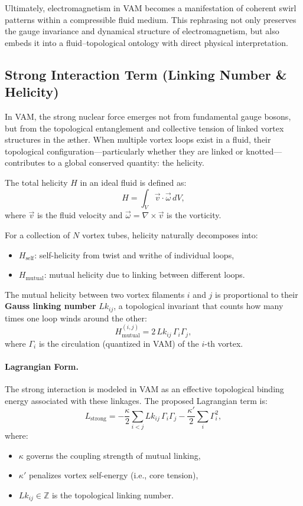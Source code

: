\documentclass[a4paper,12pt]{article}
\begin{document}
\vspace{1em}
Ultimately, electromagnetism in VAM becomes a manifestation of coherent swirl patterns within a compressible fluid medium. This rephrasing not only preserves the gauge invariance and dynamical structure of electromagnetism, but also embeds it into a fluid–topological ontology with direct physical interpretation.
\subsection{Strong Interaction Term (Linking Number \& Helicity)}

In VAM, the strong nuclear force emerges not from fundamental gauge bosons, but from the topological entanglement and collective tension of linked vortex structures in the æther. When multiple vortex loops exist in a fluid, their topological configuration—particularly whether they are linked or knotted—contributes to a global conserved quantity: the helicity.

The total helicity \( H \) in an ideal fluid is defined as:
\[
H = \int_V \vec{v} \cdot \vec{\omega} \, dV,
\]
where \( \vec{v} \) is the fluid velocity and \( \vec{\omega} = \nabla \times \vec{v} \) is the vorticity.

For a collection of \( N \) vortex tubes, helicity naturally decomposes into:
\begin{itemize}
    \item \( H_{\text{self}} \): self-helicity from twist and writhe of individual loops,
    \item \( H_{\text{mutual}} \): mutual helicity due to linking between different loops.
\end{itemize}

The mutual helicity between two vortex filaments \( i \) and \( j \) is proportional to their \textbf{Gauss linking number} \( Lk_{ij} \), a topological invariant that counts how many times one loop winds around the other:
\[
H_{\text{mutual}}^{(i,j)} = 2\, Lk_{ij} \, \Gamma_i \Gamma_j,
\]
where \( \Gamma_i \) is the circulation (quantized in VAM) of the \( i \)-th vortex.

\vspace{0.5em}
\paragraph{Lagrangian Form.} The strong interaction is modeled in VAM as an effective topological binding energy associated with these linkages. The proposed Lagrangian term is:
\begin{equation}
    L_{\text{strong}} = -\frac{\kappa}{2} \sum_{i<j} Lk_{ij} \, \Gamma_i \Gamma_j
    - \frac{\kappa'}{2} \sum_i \Gamma_i^2,
    \label{eq:strong-lagrangian}
\end{equation}
where:
\begin{itemize}
    \item \( \kappa \) governs the coupling strength of mutual linking,
    \item \( \kappa' \) penalizes vortex self-energy (i.e., core tension),
    \item \( Lk_{ij} \in \mathbb{Z} \) is the topological linking number.
\end{itemize}
\end{document}

